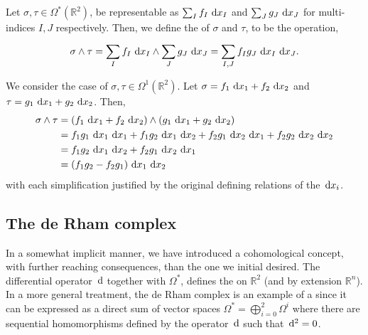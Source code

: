 \begin{definition}
	Let $ \sigma, \tau \in \Omega ^{*}(\mathbb{R}^{2}) $, be representable as $
		\sum_{I}^{}{f_I \operatorname{\, d\!}{x_I}} $ and $ \sum_{J}^{}{g_J \operatorname{\, d\!}{x_J}} $ for
	multi-indices $ I,J $ respectively. Then, we define the  of $ \sigma $ and $ \tau $, to be the operation,
	\begin{align*}
		\sigma \wedge \tau = \sum_{I}^{}{f_I \operatorname{\, d\!}{x_I}}\wedge \sum_{J}^{}{g_J
		\operatorname{\, d\!}{x_J}} = \sum_{I,J}^{}{f_I g_J \operatorname{\, d\!}{x_I}\operatorname{\, d\!}{x_J}}.
	\end{align*}
\end{definition}

\begin{example}
	We consider the case of $ \sigma, \tau \in \Omega^1(\mathbb{R}^{2}) $. Let $
		\sigma = f_1 \operatorname{\, d\!}{x_1}+f_2 \operatorname{\, d\!}{x_2} $ and $ \tau = g_1 \operatorname{\, d\!}{x_1}+g_2 \operatorname{\, d\!}{x_2} $.
	Then,
	\begin{align*}
		\sigma \wedge \tau & = \left( f_1 \d{x_1} + f_2 \d{x_2} \right)\wedge \left(
		g_1 \d{x_1}+ g_2 \d{x_2} \right)                                             \\
		                   & = f_1 g_1 \d{x_1}\d{x_1} + f_1 g_2 \d{x_1}\d{x_2} + f_2
		g_1 \d{x_2}\d{x_1} + f_2 g_2 \d{x_2}\d{x_2}                                  \\
		                   & = f_1 g_2 \d{x_1}\d{x_2} + f_2 g_1 \d{x_2}\d{x_1}       \\
		                   & = \left( f_1 g_2 - f_2 g_1 \right)\d{x_1}\d{x_2}
	\end{align*}
	with each simplification justified by the original defining relations of the
	$ \operatorname{\, d\!}{x_i} $.
\end{example}

\subsection{The de Rham complex}
In a somewhat implicit manner, we have introduced a cohomological concept, with
further reaching consequences, than the one we initial desired. The differential
operator $ \operatorname{\, d\!}{} $ together with $ \Omega ^{*} $, defines the  on $ \mathbb{R}^{2} $ (and by extension $ \mathbb{R}^{n} $). In a more
general treatment, the de Rham complex is an example of a  since it can be expressed as a direct sum of vector spaces $ \Omega
	^{*} = \bigoplus_{i=0}^{2}{\Omega^i} $ where there are sequential homomorphisms
defined by the operator $ \operatorname{\, d\!}{} $ such that $ \operatorname{\, d\!}{}^{2}=0 $.


